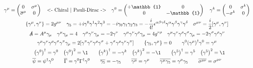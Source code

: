 \begin{gather*}
        \gamma^\mu = \begin{pmatrix}
                0                     &\sigma^\mu \\
                \overline{\sigma}^\mu &0          \\
        \end{pmatrix}
        \qqtext{<- Chiral | Pauli-Dirac ->}
        \gamma^0 = \begin{pmatrix}
                +\mathbb{1} &0           \\
                0           &-\mathbb{1} \\
        \end{pmatrix}
        \quad
        \gamma^k = \begin{pmatrix}
                0         &\sigma^k \\
                -\sigma^k &0        \\
        \end{pmatrix}
        \\
        \acomm{\gamma^\mu}{\gamma^\nu} = 2g^{\mu\nu}
        \quad
        \gamma_5
        = +i\gamma^0\gamma^1\gamma^2\gamma^3
        = -i\gamma_0\gamma_1\gamma_2\gamma_3
        = -\frac{i}{4!}\epsilon^{\alpha\beta\gamma\delta} \gamma^\alpha\gamma^\beta\gamma^\gamma\gamma^\delta
        \quad
        \sigma^{\mu\nu} = \frac{i}{2}\comm{\gamma^\mu}{\gamma^\nu}
        \\
        \slashed{A} = A^\mu\gamma_\mu
        \quad
        \gamma^\mu\gamma_\mu = 4
        \quad
        \gamma^\mu\gamma^\nu\gamma_\mu = -2\gamma^\nu
        \quad
        \gamma^\mu\gamma^\nu\gamma^\rho\gamma_\mu = 4g^{\nu\rho}
        \quad
        \gamma^\mu\gamma^\nu\gamma^\rho\gamma^\sigma\gamma_\mu = -2\gamma^\sigma\gamma^\rho\gamma^\nu
        \\
        \gamma^\mu\gamma^\nu\gamma^\rho\gamma^\sigma\gamma^\pi\gamma_\mu = 2\qty[\gamma^\pi\gamma^\nu\gamma^\rho\gamma^\sigma + \gamma^\sigma\gamma^\rho\gamma^\nu\gamma^\pi]
        \qquad
        \acomm{\gamma_5}{\gamma^\mu} = 0
        \qquad
        \gamma^0\qty(\gamma^\mu)^\dagger\gamma^0 = \gamma^\mu
        \\
        \quad
        \qty(\gamma^0)^\dagger = \gamma^0
        \quad
        \qty(\gamma^0)^2 = \1
        \qquad
        \qty(\gamma^k)^\dagger = -\gamma^k
        \quad
        \qty(\gamma^k)^2 = -\1
        \qquad
        \qty(\gamma^5)^\dagger = \gamma^5
        \quad
        \qty(\gamma^5)^2 = \1
        \\
        \overline{\psi} = \psi^\dagger\gamma^0
        \qquad
        \overline{\Gamma} = \gamma^0\Gamma^\dagger\gamma^0
        \qquad
        \overline{\gamma_5} = -\gamma_5
        \qquad
        \overline{\gamma^\mu} = \gamma^\mu
        \qquad
        \overline{\gamma^\mu\gamma_5} = \gamma^\mu\gamma_5
        \qquad
        \overline{\sigma^{\mu\nu}} = \sigma^{\mu\nu}
\end{gather*}
